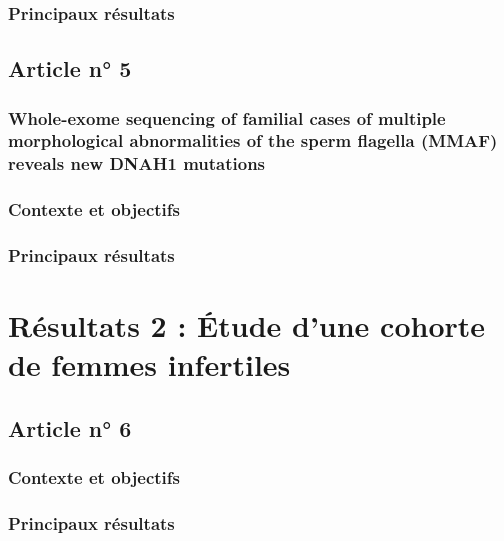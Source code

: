 \documentclass[12pt,twoside]{ugathesis}
\begin{document}
\subsubsection{Principaux résultats}\label{principaux-resultats-1}

\subsection{Article n° 5}\label{article-n-5}

\subsubsection{Whole-exome sequencing of familial cases of multiple
morphological abnormalities of the sperm flagella (MMAF) reveals new
DNAH1
mutations}\label{whole-exome-sequencing-of-familial-cases-of-multiple-morphological-abnormalities-of-the-sperm-flagella-mmaf-reveals-new-dnah1-mutations}

\subsubsection{Contexte et objectifs}\label{contexte-et-objectifs-2}

\subsubsection{Principaux résultats}\label{principaux-resultats-2}

\section{Résultats 2 : Étude d'une cohorte de femmes
infertiles}\label{resultats-2-etude-dune-cohorte-de-femmes-infertiles}

\subsection{Article n° 6}\label{article-n-6}

\subsubsection{Contexte et objectifs}\label{contexte-et-objectifs-3}

\subsubsection{Principaux résultats}\label{principaux-resultats-3}
\end{document}
